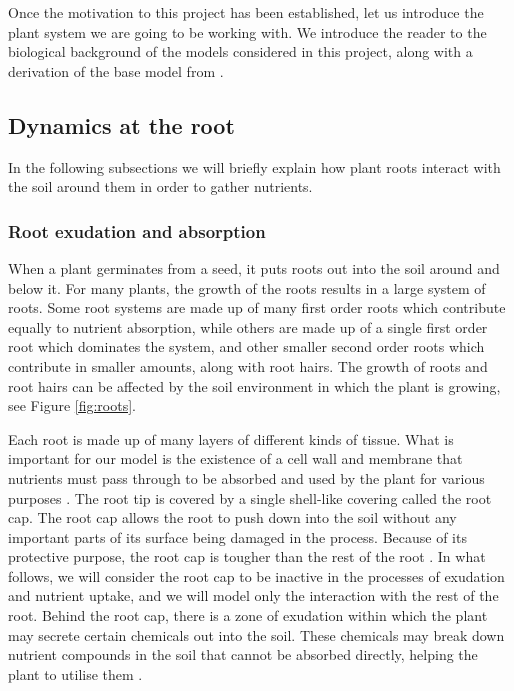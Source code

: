 \documentclass[11pt]{article}
\numberwithin{equation}{section}
\begin{document}
Once the motivation to this project has been established, let us introduce the plant system we are going to be working with. We introduce the reader to the biological background of the models considered in this project, along with a derivation of the base model from \cite{Ptashnyk-2011}.

\subsection{Dynamics at the root}
In the following subsections we will briefly explain how plant roots interact with the soil around them in order to gather nutrients.

\subsubsection{Root exudation and absorption}

When a plant germinates from a seed, it puts roots out into the soil around and below it. For many plants, the growth of the roots results in a large system of roots.
Some root systems are made up of many first order roots which contribute equally to nutrient absorption, while others are made up of a single first order root which dominates the system, and other smaller second order roots which contribute in smaller amounts, along with root hairs. 
The growth of roots and root hairs can be affected by the soil environment in which the plant is growing, see Figure \ref{fig:roots}.

Each root is made up of many layers of different kinds of tissue. What is important for our model is the existence of a cell wall and membrane that nutrients must pass through to be absorbed and used by the plant for various purposes \cite{PALLARDY2008255}. The root tip is covered by a single shell-like covering called the root cap. The root cap allows the root to push down into the soil without any important parts of its surface being damaged in the process. Because of its protective purpose, the root cap is tougher than the rest of the root \cite{haberlandt1914}. In what follows, we will consider the root cap to be inactive in the processes of exudation and nutrient uptake, and we will model only the interaction with the rest of the root.
Behind the root cap, there is a zone of exudation within which the plant may secrete certain chemicals out into the soil. These chemicals may break down nutrient compounds in the soil that cannot be absorbed directly, helping the plant to utilise them \cite{10.3389/fpls.2019.00157}.
\end{document}
